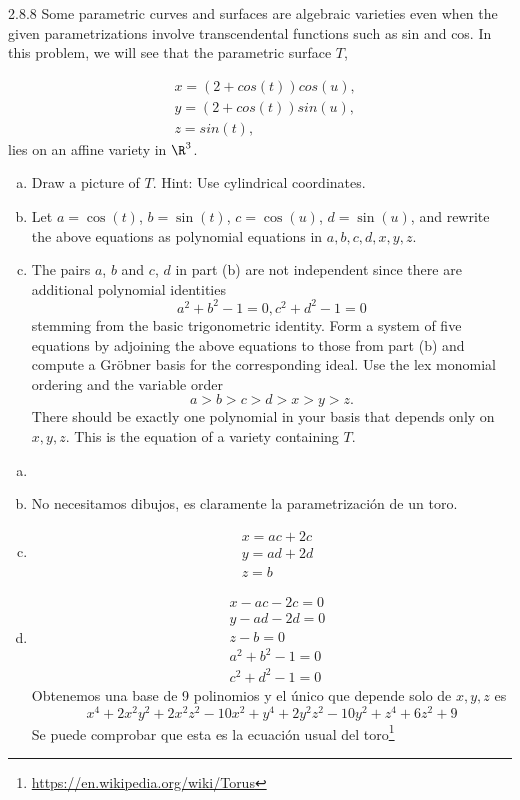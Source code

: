 \documentclass[twoside]{article}
\begin{document}
\begin{ejercicio}{2.8.8}
Some parametric curves and surfaces are algebraic varieties even when the given
parametrizations involve transcendental functions such as sin and cos. In this problem,
we will see that the parametric surface $T$,

\begin{align*}
&x = (2 + cos(t)) cos(u),\\
&y = (2 + cos(t)) sin(u),\\
&z = sin(t),
\end{align*}
lies on an affine variety in $\R^3$.
\begin{enumerate}[a.]
\item Draw a picture of $T$. Hint: Use cylindrical coordinates.
\item Let $a = \cos(t)$, $b = \sin(t)$, $c = \cos(u)$, $d = \sin(u)$, and rewrite the above equations
as polynomial equations in $a, b, c, d, x, y, z$.
\item The pairs $a$, $b$ and $c$, $d$ in part (b) are not independent since there are additional polynomial
identities
$$a^2 + b^2 − 1 = 0, c^2 + d^2 − 1 = 0$$
stemming from the basic trigonometric identity. Form a system of five equations by
adjoining the above equations to those from part (b) and compute a Gröbner basis for
the corresponding ideal. Use the lex monomial ordering and the variable order
$$a > b > c > d > x > y > z.$$
There should be exactly one polynomial in your basis that depends only on $x, y, z$.
This is the equation of a variety containing $T$.
\end{enumerate}
\end{ejercicio}
\begin{solucion}
\begin{enumerate}[a.]
\item[]
\item No necesitamos dibujos, es claramente la parametrización  de un toro.
\item 
\begin{align*}
&x=ac+2c\\
&y=ad+2d\\
&z=b
\end{align*}
\item 
\begin{align*}
&x-ac-2c=0\\
&y-ad-2d=0\\
&z-b=0\\
&a^2 + b^2 − 1 = 0\\
& c^2 + d^2 − 1 = 0
\end{align*}
Obtenemos una base de 9 polinomios y el único que depende solo de $x,y,z$ es
\[
x^4 + 2x^2y^2 + 2x^2z^2 - 10x^2 + y^4 + 2y^2z^2 - 10y^2 + z^4 + 6z^2 + 9
\]
Se puede comprobar que esta es la ecuación usual del toro\footnote{\url{https://en.wikipedia.org/wiki/Torus}}
\end{enumerate}

\end{solucion}
\end{document}
